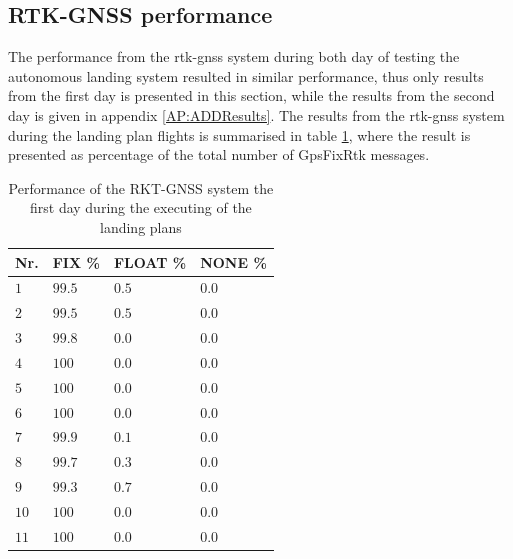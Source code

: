 \subsection{RTK-GNSS performance}
The performance from the \gls{rtk-gnss} system during both day of testing the autonomous landing system resulted in similar performance, thus only results from the first day is presented in this section, while the results from the second day is given in appendix \ref{AP:ADDResults}. The results from the \gls{rtk-gnss} system during the landing plan flights is summarised in table \ref{TB:RTKFirstDayRTK}, where the result is presented as percentage of the total number of GpsFixRtk messages.
\begin{table}[H]
\centering
\begin{tabular}{| l | l | l | l |}
\hline
\textbf{Nr.}	& \textbf{FIX \%}	& \textbf{FLOAT \%}	& \textbf{NONE \%}	\\ \hline
$1$				& $99.5 $	& $0.5$	& $0.0$									\\ \hline
$2$				& $99.5 $	& $0.5$	& $0.0$									\\ \hline
$3$				& $99.8 $	& $0.0$	& $0.0$									\\ \hline
$4$				& $100$		& $0.0$	& $0.0$									\\ \hline
$5$				& $100$		& $0.0$	& $0.0$									\\ \hline
$6$				& $100$		& $0.0$	& $0.0$									\\ \hline
$7$				& $99.9$	& $0.1$	& $0.0$									\\ \hline
$8$				& $99.7 $ 	& $0.3$	& $0.0$									\\ \hline
$9$				& $99.3$	& $0.7$	& $0.0$									\\ \hline
$10$			& $100$		& $0.0$	& $0.0$									\\ \hline
$11$			& $100$		& $0.0$	& $0.0$									\\ \hline
\end{tabular}
\caption{Performance of the RKT-GNSS system the first day during the executing of the landing plans}
\label{TB:RTKFirstDayRTK}
\end{table}

